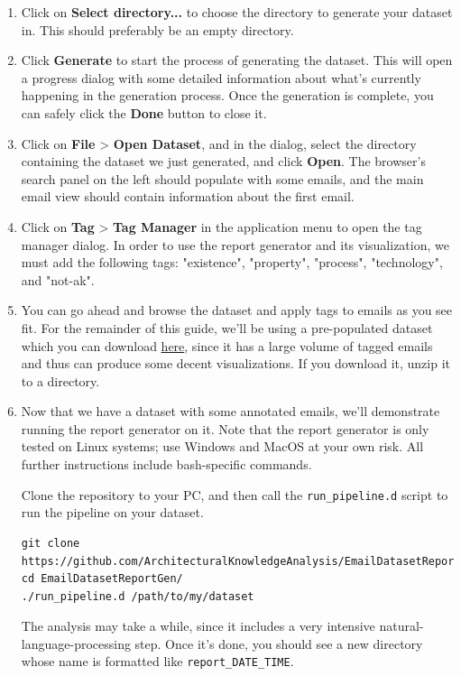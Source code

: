 \documentclass[a4paper, 12pt]{article}
\begin{document}
\begin{enumerate}
			\item Click on \textbf{Select directory...} to choose the directory to generate your dataset in. This should preferably be an empty directory.
			
			\item Click \textbf{Generate} to start the process of generating the dataset. This will open a progress dialog with some detailed information about what's currently happening in the generation process. Once the generation is complete, you can safely click the \textbf{Done} button to close it.
			
			\item Click on \textbf{File} > \textbf{Open Dataset}, and in the dialog, select the directory containing the dataset we just generated, and click \textbf{Open}. The browser's search panel on the left should populate with some emails, and the main email view should contain information about the first email.
			
			\item Click on \textbf{Tag} > \textbf{Tag Manager} in the application menu to open the tag manager dialog. In order to use the report generator and its visualization, we must add the following tags: "existence", "property", "process", "technology", and "not-ak".
			
			\item You can go ahead and browse the dataset and apply tags to emails as you see fit. For the remainder of this guide, we'll be using a pre-populated dataset which you can download \href{https://github.com/ArchitecturalKnowledgeAnalysis/Datasets/raw/main/datasets/iteration-9.zip}{here}, since it has a large volume of tagged emails and thus can produce some decent visualizations. If you download it, unzip it to a directory.
			
			\item Now that we have a dataset with some annotated emails, we'll demonstrate running the report generator on it. Note that the report generator is only tested on Linux systems; use Windows and MacOS at your own risk. All further instructions include bash-specific commands.
			
				Clone the repository to your PC, and then call the \texttt{run\_pipeline.d} script to run the pipeline on your dataset.
				\begin{verbatim}
git clone https://github.com/ArchitecturalKnowledgeAnalysis/EmailDatasetReportGen.git
cd EmailDatasetReportGen/
./run_pipeline.d /path/to/my/dataset
				\end{verbatim}
				The analysis may take a while, since it includes a very intensive natural-language-processing step. Once it's done, you should see a new directory whose name is formatted like \texttt{report\_DATE\_TIME}.
				

\end{enumerate}
\end{document}
